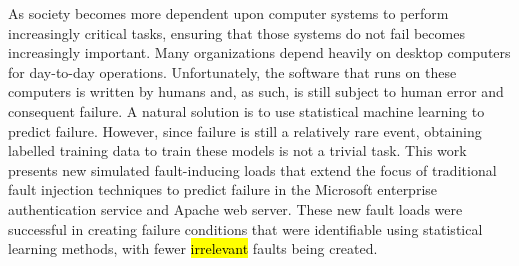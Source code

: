 As society becomes more dependent upon computer systems to perform increasingly
critical tasks, ensuring that those systems do not fail becomes increasingly
important.  Many organizations depend heavily on desktop computers for
day-to-day operations. Unfortunately, the software that runs on these computers
is written by humans and, as such, is still subject to human error and
consequent failure. A natural solution is to use statistical machine learning
to predict failure. However, since failure is still a relatively rare event,
obtaining labelled training data to train these models is not a trivial task.
This work presents new simulated fault-inducing loads that extend the focus of
traditional fault injection techniques to predict failure in the Microsoft
enterprise authentication service and Apache web server. These new fault loads
were successful in creating failure conditions that were identifiable using
statistical learning methods, with fewer \hl{irrelevant} faults being created.
